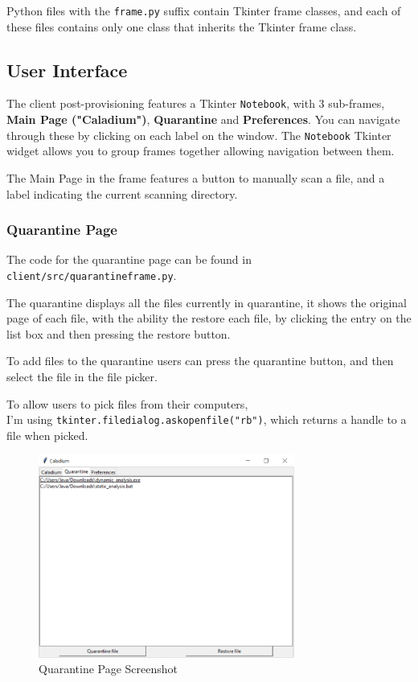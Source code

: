 Python files with the \texttt{frame.py} suffix contain Tkinter frame classes,
and each of these files contains only one class that inherits the Tkinter frame class.

\subsection{User Interface}
The client post-provisioning features a Tkinter \texttt{Notebook},
with 3 sub-frames, \textbf{Main Page ("Caladium")},
\textbf{Quarantine} and \textbf{Preferences}.
You can navigate through these by clicking on each label on the window.
The \texttt{Notebook} Tkinter widget allows you to
group frames together allowing navigation between them.

The Main Page in the frame features a button to manually scan a file,
and a label indicating the current scanning directory.

\subsubsection{Quarantine Page}
The code for the quarantine page can be found in \texttt{client/src/quarantineframe.py}.

The quarantine displays all the files currently in quarantine, it shows the original page of each file, with the ability the restore each file, by clicking the entry on the list box and then pressing the restore button.

To add files to the quarantine users can press the quarantine button, and then select the file in the file picker.

To allow users to pick files from their computers, \\
I'm using \texttt{tkinter.filedialog.askopenfile("rb")},
which returns a handle to a file when picked.

\begin{figure}[h!]
    \centering
    \label{image:quarantinePageScreenshot}
    \includegraphics[width=0.75\textwidth]{../docs/client.png}
    \caption{Quarantine Page Screenshot}
\end{figure}

